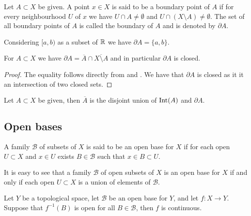 \documentclass[11pt,a4paper]{article}
\begin{document}
\begin{definition}[Boundary] \label{dfn:boundary}
  Let $A \subset X$ be given. A point $x \in X$ is said to be a boundary
  point of $A$ if for every neighbourhood $U$ of $x$ we have 
  $U \cap A \neq \emptyset$ and $U \cap (X \setminus A) \neq \emptyset$.
  The set of all boundary points of $A$ is called the boundary of $A$ and 
  is denoted by $\partial A$.
\end{definition}

\begin{example}
  Considering $[a,b)$ as a subset of $\mathbb{R}$ we have $\partial A = \{a,b\}$.
\end{example}

\begin{proposition}
  For $A \subset X$ we have 
  $\partial A = \overline{A} \cap \overline{X \setminus A}$ and in 
  particular $\partial A$ is closed.
\end{proposition}
\begin{proof}
  The equality follows directly from  and
  . We have that $\partial A$ is closed as it
  it an intersection of two closed sets.
\end{proof}

\begin{proposition}
  Let $A \subset X$ be given, then $\overline A$ is the disjoint union of 
  $\operatorname{Int}(A)$ and $\partial A$.
\end{proposition}

\subsection{Open bases}

\begin{definition}
  A family $\mathcal{B}$ of subsets of $X$ is said to be an open base
  for $X$ if for each open $U \subset X$ and $x \in U$ exists 
  $B \in \mathcal{B}$ such that $x \in B \subset U$.
\end{definition}

\begin{remark}
  It is easy to see that a family $\mathcal{B}$ of open subsets of $X$ is an 
  open base for $X$ if and only if each open $U \subset X$ is a union of 
  elements of $\mathcal{B}$.
\end{remark}

\begin{proposition}\label{prp:base-continuity}
  Let $Y$ be a topological space, let $\mathcal B$ be an open base for $Y$, 
  and let $f \colon X \to Y$. 
  Suppose that $f^{-1}(B)$ is open for all $B \in \mathcal B$,
  then $f$ is continuous.
\end{proposition}
\end{document}
